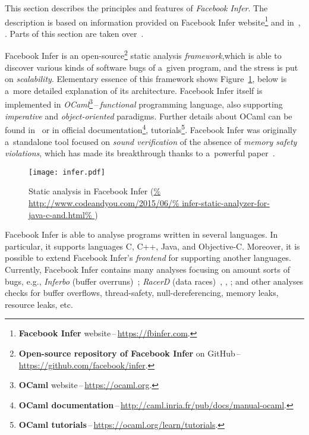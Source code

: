 This section describes the principles and features of
\emph{Facebook Infer}. The description is based on information provided
on Facebook Infer website\footnote{\textbf{Facebook Infer}
website\,--\,\url{https://fbinfer.com}.} and in~\cite{inferAISlides},
\cite{projectPracticeMarcin2018}. Parts of this section are taken
over~\cite{excel2019FBInfer}.

Facebook Infer is an open-source\footnote{\textbf{Open-source repository of
Facebook Infer} on GitHub\,--\,\url{https://github.com/facebook/infer}.}
static analysis \emph{framework},which is able to discover various kinds of
software bugs of a~given program, and the stress is put on \emph{scalability}.
Elementary essence of this framework shows Figure~\ref{fig:infer}, below
is a~more detailed explanation of its architecture. Facebook Infer
itself is implemented in \emph{OCaml}\footnote{\textbf{OCaml}
website\,--\,\url{https://ocaml.org}.}\,--\,\emph{functional} programming
language, also supporting \emph{imperative} and \emph{object-oriented}
paradigms. Further details about OCaml can be found in~\cite{realWorldOCaml}
or in official documentation\footnote{\textbf{OCaml
documentation}\,--\,\url{http://caml.inria.fr/pub/docs/manual-ocaml}.},
tutorials\footnote{\textbf{OCaml
tutorials}\,--\,\url{https://ocaml.org/learn/tutorials}.}. Facebook Infer was
originally a~standalone tool focused on \emph{sound verification} of
the absence of \emph{memory safety violations}, which has made its breakthrough
thanks to a~powerful paper~\cite{inferBiabduction}.

\begin{figure}[hbt]
    \centering
    \texttt{[image: infer.pdf]}
    \caption{%
        Static analysis in Facebook Infer
        (\url{%
            http://www.codeandyou.com/2015/06/%
            infer-static-analyzer-for-java-c-and.html%
        })
    }
    \label{fig:infer}
\end{figure}

Facebook Infer is able to analyse programs written in several languages.
In particular, it supports languages C, C++, Java, and Objective-C. Moreover,
it is possible to extend Facebook Infer's \emph{frontend} for supporting
another languages. Currently, Facebook Infer contains many analyses focusing
on amount sorts of bugs, e.g., \emph{Inferbo} (buffer
overruns)~\cite{inferboOnline}; \emph{RacerD} (data races)~\cite{racerD},
\cite{racerDOnline}, \cite{staticRaceDetectorTruePositive}; and other analyses
checks for buffer overflows, thread-safety, null-dereferencing, memory leaks,
resource leaks, etc.


